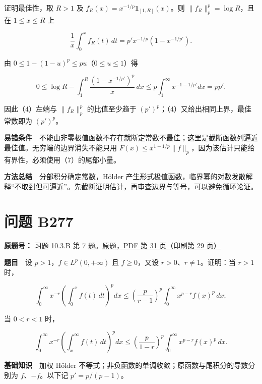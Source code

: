 \documentclass[11pt,a4paper]{article}
\begin{document}
证明最佳性，取 \(R>1\) 及 \(f_R(x)=x^{-1/p}\mathbf1_{[1,R]}(x)\)。则
\(\|f_R\|_p^p=\log R\)，且在 \(1\le x\le R\) 上

\begin{equation}
\frac1x\int_0^x f_R(t)\,dt
=p'x^{-1/p}(1-x^{-1/p'}).
\tag{9}
\end{equation}

由 \(0\le1-(1-u)^p\le pu\)（\(0\le u\le1\)）得

\begin{equation}
0\le\log R-\int_1^R\frac{(1-x^{-1/p'})^p}{x}\,dx
\le p\int_1^\infty x^{-1-1/p'}dx=pp'.
\tag{10}
\end{equation}

因此（4）左端与 \(\|f_R\|_p^p\) 的比值至少趋于
\((p')^p\)；（4）又给出相同上界，最佳常数即为 \((p')^p\)。

\textbf{易错条件}　不能由非零极值函数不存在就断定常数不最佳；这里是截断函数列逼近最佳值。无穷端的边界消失不能只用
\(F(x)\le x^{1-1/p}\|f\|_p\)，因为该估计只能给有界性，必须使用（7）的尾部小量。

\textbf{方法总结}　分部积分确定常数，Hölder
产生形式极值函数，临界幂的对数发散解释``不取到但可逼近''。先截断证明估计，再审查边界与等号，可以避免循环论证。

\section{问题 B277}\label{ux95eeux9898-b277}

\textbf{原题号：} 习题 10.3.B 第 7
题。\href{https://zj139.github.io/math-notes/files/problems/楼分析习题-v2.pdf\#page=31}{原题，PDF
第 31 页（印刷第 29 页）}

\textbf{题目}　设 \(p>1\)，\(f\in L^p(0,+\infty)\) 且 \(f\ge0\)，又设
\(r>0\)、\(r\ne1\)。证明：当 \(r>1\) 时，

\begin{equation}
\int_0^\infty x^{-r}\left(\int_0^x f(t)\,dt\right)^pdx
\le\left(\frac p{r-1}\right)^p
\int_0^\infty x^{p-r}f(x)^p\,dx;
\tag{11}
\end{equation}

当 \(0<r<1\) 时，

\begin{equation}
\int_0^\infty x^{-r}\left(\int_x^\infty f(t)\,dt\right)^pdx
\le\left(\frac p{1-r}\right)^p
\int_0^\infty x^{p-r}f(x)^p\,dx.
\tag{12}
\end{equation}

\textbf{基础知识}　加权 Hölder
不等式；非负函数的单调收敛；原函数与尾积分的导数分别为
\(f\)、\(-f\)。以下记 \(p'=p/(p-1)\)。
\end{document}
